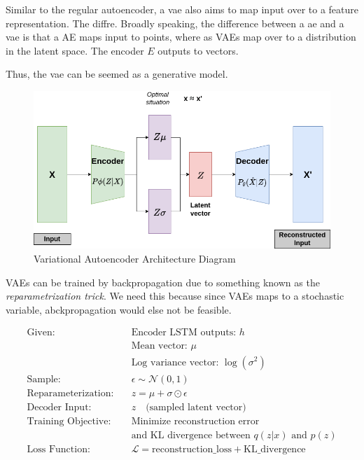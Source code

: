Similar to the regular autoencoder, a \acrfull{vae} also aims to map input over to a feature representation. The diffre. Broadly speaking, the difference between a \acrshort{ae} and a \acrshort{vae} is that a AE maps input to points, where as VAEs map over to a distribution in the latent space. The encoder $E$ outputs to vectors. 

Thus, the \acrlong{vae} can be seemed as a generative model.


\begin{figure}[h]
    \centering
    \includegraphics[scale=0.5]{figures/vae.png}
    \caption{Variational Autoencoder Architecture Diagram}
    \label{fig:vaediagram}
\end{figure}


VAEs can be trained by backpropagation due to something known as the \textit{reparametrization trick}. We need this because since VAEs maps to a stochastic variable, abckpropagation would else not be feasible.

\begin{align*}
\text{Given:} & \quad \text{Encoder LSTM outputs: } h \\
& \quad \text{Mean vector: } \mu \\
& \quad \text{Log variance vector: } \log(\sigma^2) \\
\text{Sample:} & \quad \epsilon \sim \mathcal{N}(0, 1) \\
\text{Reparameterization:} & \quad z = \mu + \sigma \odot \epsilon \\
\text{Decoder Input:} & \quad z \quad \text{(sampled latent vector)} \\
\text{Training Objective:} & \quad \text{Minimize reconstruction error} \\
& \quad \text{and KL divergence between } q(z|x) \text{ and } p(z) \\
\text{Loss Function:} & \quad \mathcal{L} = \text{reconstruction\_loss} + \text{KL\_divergence}
\end{align*}


